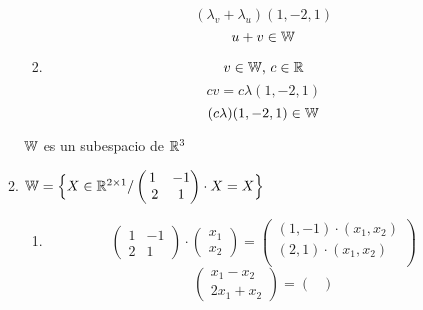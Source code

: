 \documentclass[../practica.root.tex]{subfiles}
\begin{document}
\begin{enumerate}
\begin{enumerate}
\begin{enumerate}
                              \[ (\lambda_v + \lambda_u)(1,-2,1) \]
                              \[ u + v \in \mathbb{W} \]
                        \item \[ v \in \mathbb{W}\text{, } c \in \mathbb{R} \]
                              \[ cv = c\lambda(1,-2,1) \]
                              \[ (c\lambda)(1,-2,1) \in \mathbb{W} \]
                    \end{enumerate}
                    $\mathbb{W}$ es un subespacio de $\mathbb{R}^3$
              \item $ \W = \Big\{ X \in \R^{2\x1} /
                        \begin{pmatrix}
                            1 & -1
                            \\ 2 & 1
                        \end{pmatrix}
                        \cdot
                        X = X
                        \Big\} $
                    \begin{enumerate} %
                        \item \[
                                  \begin{pmatrix}
                                      1 & -1 \\
                                      2 & 1
                                  \end{pmatrix}
                                  \cdot
                                  \begin{pmatrix}
                                      x_1 \\ x_2
                                  \end{pmatrix}
                                  =
                                  \begin{pmatrix}
                                      (1,-1)\cdot(x_1,x_2) \\
                                      (2, 1)\cdot(x_1,x_2) \\
                                  \end{pmatrix}
                              \]
                              \[
                                  \begin{pmatrix}
                                      x_1 - x_2 \\
                                      2x_1 + x_2
                                  \end{pmatrix}
                                  =
                                  \begin{pmatrix}

\end{pmatrix}\]
\end{enumerate}
\end{enumerate}
\end{enumerate}
\end{document}

